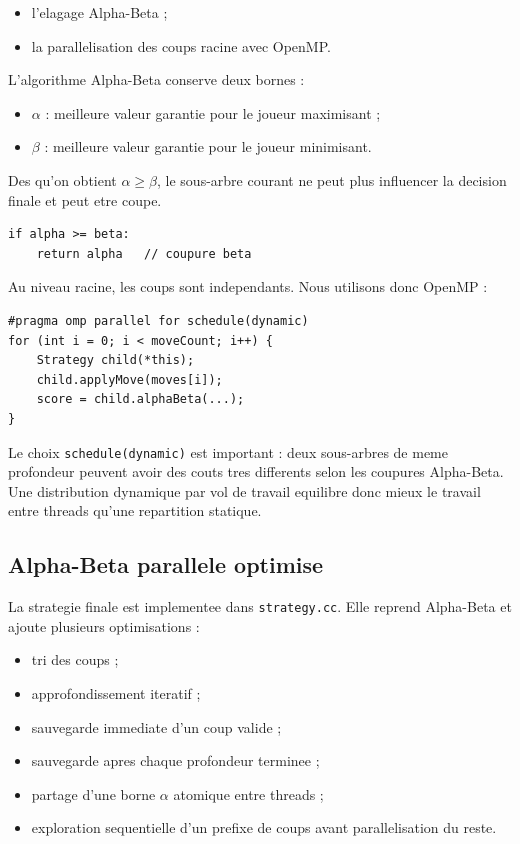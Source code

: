 \documentclass[12pt,a4paper]{article}
\begin{document}
    \begin{itemize}[nosep]
    \item l'elagage Alpha-Beta ;
    \item la parallelisation des coups racine avec OpenMP.
    \end{itemize}

    L'algorithme Alpha-Beta conserve deux bornes :

    \begin{itemize}[nosep]
    \item $\alpha$ : meilleure valeur garantie pour le joueur maximisant ;
    \item $\beta$ : meilleure valeur garantie pour le joueur minimisant.
    \end{itemize}

    Des qu'on obtient $\alpha \geq \beta$, le sous-arbre courant ne peut plus influencer la decision finale
    et peut etre coupe.

    \begin{lstlisting}
if alpha >= beta:
    return alpha   // coupure beta
    \end{lstlisting}

    Au niveau racine, les coups sont independants. Nous utilisons donc OpenMP :

    \begin{lstlisting}
#pragma omp parallel for schedule(dynamic)
for (int i = 0; i < moveCount; i++) {
    Strategy child(*this);
    child.applyMove(moves[i]);
    score = child.alphaBeta(...);
}
    \end{lstlisting}

    Le choix \texttt{schedule(dynamic)} est important : deux sous-arbres de meme profondeur peuvent avoir
    des couts tres differents selon les coupures Alpha-Beta. Une distribution dynamique par vol de travail equilibre donc mieux
    le travail entre threads qu'une repartition statique.

    \subsection{Alpha-Beta parallele optimise}

    La strategie finale est implementee dans \texttt{strategy.cc}. Elle reprend Alpha-Beta et ajoute
    plusieurs optimisations :

    \begin{itemize}[nosep]
    \item tri des coups ;
    \item approfondissement iteratif ;
    \item sauvegarde immediate d'un coup valide ;
    \item sauvegarde apres chaque profondeur terminee ;
    \item partage d'une borne $\alpha$ atomique entre threads ;
    \item exploration sequentielle d'un prefixe de coups avant parallelisation du reste.
    \end{itemize}
\end{document}
